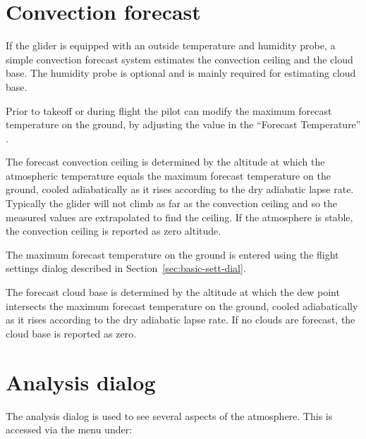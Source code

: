 \documentclass[a4paper,12pt]{refrep}
\begin{document}
\section{Convection forecast}\label{sec:convection-forecast}

If the glider is equipped with an outside temperature and humidity
probe, a simple convection forecast system estimates the convection
ceiling and the cloud base.  The humidity probe is optional and is
mainly required for estimating cloud base.

Prior to takeoff or during flight the pilot can modify the maximum
forecast temperature on the ground, by adjusting the value in the
``Forecast Temperature'' {\InfoBox}.

The forecast convection ceiling is determined by the altitude at which
the atmospheric temperature equals the maximum forecast temperature on
the ground, cooled adiabatically as it rises according to the dry
adiabatic lapse rate.  Typically the glider will not climb as far as
the convection ceiling and so the measured values are extrapolated to
find the ceiling.  If the atmosphere is stable, the convection ceiling
is reported as zero altitude.

The maximum forecast temperature on the ground is entered using the
flight settings dialog described in Section~\ref{sec:basic-sett-dial}.


%

The forecast cloud base is determined by the altitude at which the dew
point intersects the maximum forecast temperature on the ground,
cooled adiabatically as it rises according to the dry adiabatic lapse
rate.  If no clouds are forecast, the cloud base is reported as zero.


\section{Analysis dialog}

The analysis dialog is used to see several aspects of the atmosphere.
This is accessed via the menu under:
\begin{quote}
\blink{}
\end{quote}
\end{document}
